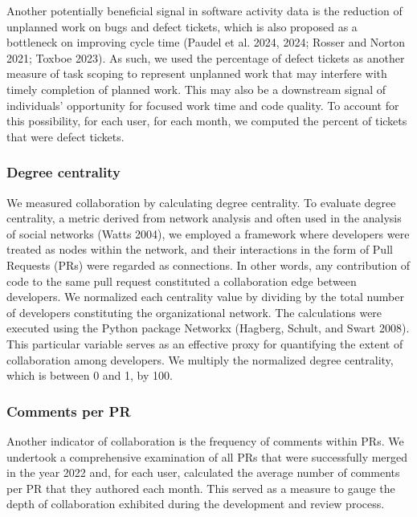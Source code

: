 \documentclass[
]{article}
\begin{document}
Another potentially beneficial signal in software activity data is the
reduction of unplanned work on bugs and defect tickets, which is also
proposed as a bottleneck on improving cycle time (Paudel et al. 2024,
2024; Rosser and Norton 2021; Toxboe 2023). As such, we used the
percentage of defect tickets as another measure of task scoping to
represent unplanned work that may interfere with timely completion of
planned work. This may also be a downstream signal of individuals'
opportunity for focused work time and code quality. To account for this
possibility, for each user, for each month, we computed the percent of
tickets that were defect tickets.

\subsubsection{Degree centrality}\label{degree-centrality}

We measured collaboration by calculating degree centrality. To evaluate
degree centrality, a metric derived from network analysis and often used
in the analysis of social networks (Watts 2004), we employed a framework
where developers were treated as nodes within the network, and their
interactions in the form of Pull Requests (PRs) were regarded as
connections. In other words, any contribution of code to the same pull
request constituted a collaboration edge between developers. We
normalized each centrality value by dividing by the total number of
developers constituting the organizational network. The calculations
were executed using the Python package Networkx (Hagberg, Schult, and
Swart 2008). This particular variable serves as an effective proxy for
quantifying the extent of collaboration among developers. We multiply
the normalized degree centrality, which is between 0 and 1, by 100.

\subsubsection{Comments per PR}\label{comments-per-pr}

Another indicator of collaboration is the frequency of comments within
PRs. We undertook a comprehensive examination of all PRs that were
successfully merged in the year 2022 and, for each user, calculated the
average number of comments per PR that they authored each month. This
served as a measure to gauge the depth of collaboration exhibited during
the development and review process.
\end{document}
